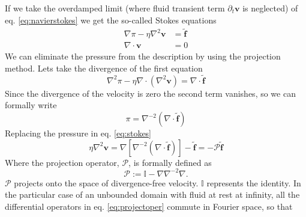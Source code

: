 \documentclass[ twoside,openright,titlepage,numbers=noenddot,%
headinclude,footinclude,cleardoublepage=empty,abstract=on,
BCOR=5mm,paper=a4,fontsize=11pt, dvipsnames
]{scrreprt}
\renewcommand{\vec}[1]{\bm{#1}}
\newcommand{\oper}[1]{\mathcal{#1}}
\newcommand{\fvel}{v}
\begin{document}
If we take the overdamped limit (where fluid transient term $\partial_t \vec{\fvel}$ is neglected) of eq. \eqref{eq:navierstokes} we get the so-called Stokes equations
\begin{equation}
  \label{eq:stokes}
  \begin{aligned}
    \nabla \pi - \eta \nabla^2\vec{\fvel} &=  \tilde{\vec{f}}\\
    \nabla\cdot\vec{\fvel} &= 0
  \end{aligned}  
\end{equation}
We can eliminate the pressure from the description by using the projection method. Lets take the divergence of the first equation
\begin{equation}
  \nabla^2 \pi - \eta \nabla\cdot(\nabla^2\vec{\fvel}) =  \nabla\cdot\tilde{\vec{f}}
\end{equation}
Since the divergence of the velocity is zero the second term vanishes, so we can formally write
\begin{equation}
  \label{eq:stokespressure}
  \pi = \nabla^{-2}(\nabla\cdot\tilde{\vec{f}})
\end{equation}
Replacing the pressure in eq. \eqref{eq:stokes}
\begin{equation}
  \eta\nabla^2\vec{\fvel} = \nabla\left[\nabla^{-2}(\nabla\cdot\tilde{\vec{f}})\right] - \tilde{\vec{f}} = -\oper{P} \tilde{\vec{f}}
\end{equation}
Where the projection operator, $\oper{P}$, is formally defined as
\begin{equation}
  \label{eq:projectoper}
\oper{P}  :=  \mathbb{I} - \nabla\nabla^{-2}\nabla.
\end{equation}
$\oper{P}$ projects onto the space of divergence-free velocity. $\mathbb{I}$ represents the identity.
In the particular case of an unbounded domain with fluid at rest at infinity, all the differential operators in eq. \eqref{eq:projectoper} commute in Fourier space, so that
\end{document}
